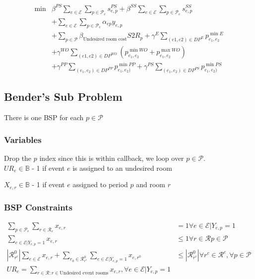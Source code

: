 \documentclass{article}
\newcommand{\scriptP}{\mathcal{P}}
\newcommand{\scriptR}{\mathcal{R}}
\newcommand{\scriptE}{\mathcal{E}}
\newcommand{\B}{\mathbb{B}}
\begin{document}
\begin{align} 
    \min &\beta^{PS}\sum_{e\in \scriptE}\sum_{p\in\scriptP_e}s^{PS}_{e,p} + \beta^{SS}\sum_{e\in\scriptE}\sum_{p\in\scriptP_e}s^{SS}_{e,p} \\
    &+\sum_{e\in\scriptE}\sum_{p\in\scriptP_e}\alpha_{ep}y_{e,p} \\
    &+\sum_{p\in\scriptP}\beta_{\text{Undesired room cost}} S2R_{p}
    + \gamma^E\sum_{(e1, e2)\in DP^{E}} p^{\min E}_{e_1, e_2} \\
    &+ \gamma^{WO} \sum_{(e1, e2)\in DP^{WO}}\left(p^{\min WO}_{e_1, e_2} + p^{\max WO}_{e_1, e_2}\right) \\
    &+ \gamma^{PP}\sum_{(e_1, e_2)\in DP^{PP}} p^{\min PP}_{e_1, e_2)}
    + \gamma^{PS}\sum_{(e_1, e_2)\in DP^{PS}} p^{\min PS}_{e_1, e_2)}
\end{align}


\newpage
\subsection{Bender's Sub Problem}
There is one BSP for each $p\in \scriptP$

\subsubsection{Variables}
Drop the $p$ index since this is within callback, we loop over $p\in \scriptP$.\\


$UR_{e}\in\B$ - 1 if event $e$ is assigned to an undesired room

$X_{e,r} \in \B$ - 1 if event $e$ assigned to period $p$ and room $r$

\subsubsection{BSP Constraints}

\begin{align}
    \sum_{p\in\scriptP_e}\sum_{r\in\scriptR_e} x_{e,r} &= 1 \forall e \in \scriptE | Y_{e,p} = 1 \\
    \sum_{e\in \scriptE| Y_{e,p} = 1} x_{e,r} &\le 1 \forall r \in \scriptR p \in \scriptP \\
    |\scriptR^0_{r^c}| \sum_{e\in\scriptE} x_{e,r} + \sum_{r_0\in\scriptR^0_{r^c}}\sum_{e\in \scriptE| Y_{e,p} = 1}x_{e,r^0} &\le |\scriptR^0_{r^c}| \forall r^c \in \scriptR^c, \forall p \in \scriptP \\
    UR_{e} = \sum_{r\in \scriptR : r \in \text{Undesired event rooms}} x_{e,r}, \forall e\in \scriptE | Y_{e,p} = 1
\end{align}
\end{document}
